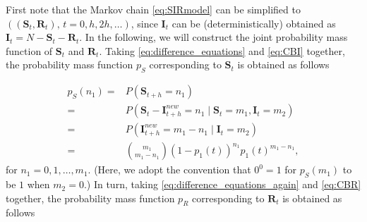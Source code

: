 \documentclass[a4paper,preprint]{elsarticle}
\renewcommand{\vec}[1]{\boldsymbol{#1}}
\begin{document}
First note that the Markov chain \eqref{eq:SIRmodel} can be simplified to $((\vec{S}_{t}, \vec{R}_{t}) \mbox{, }t=0,h,2h,\ldots)$, since $\vec{I}_{t}$ can be (deterministically) obtained as $\vec{I}_{t}=N-\vec{S}_{t}-\vec{R}_{t}$. In the following, we will construct the joint probability mass function of $\vec{S}_{t}$ and $\vec{R}_{t}$. Taking \eqref{eq:difference_equations} and \eqref{eq:CBI} together, the probability mass function  $p_S$ corresponding to $\vec{S}_{t}$ is obtained as follows

\begin{equation}
\begin{split}
\label{eq:Spmf}
p_S(n_1)=&P(\vec{S}_{t+h}=n_1)\\
={} & P(\vec{S}_{t}-\vec{I}_{t+h}^{new}=n_1\mid \vec{S}_{t}=m_1,\vec{I}_{t}=m_2) \\
={} & P(\vec{I}_{t+h}^{new}=m_1-n_1\mid \vec{I}_{t}=m_2) \\
={} & {\binom{m_1}{m_1-n_1}}(1-p_1(t))^{n_1}p_1(t)^{m_1-n_1},       
\end{split}
\end{equation}
%
for $n_1=0,1,\ldots,m_1$. (Here, we adopt the convention that $0^0 = 1$ for $p_S(m_1)$ to be $1$ when $m_2 = 0$.) In turn, taking \eqref{eq:difference_equations_again} and \eqref{eq:CBR} together, the probability mass function  $p_R$ corresponding to $\vec{R}_{t}$ is obtained as follows 
\end{document}
